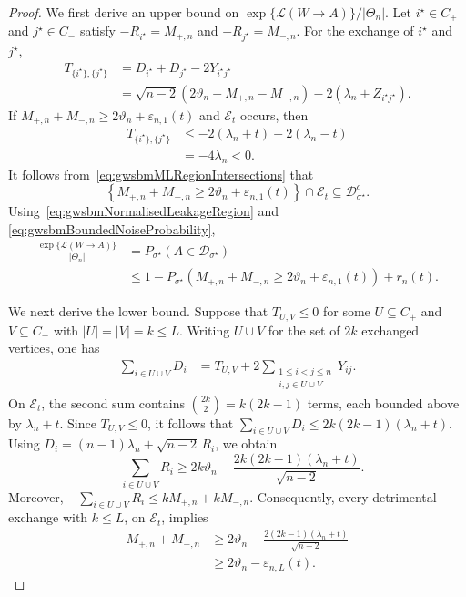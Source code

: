 \documentclass[10pt,a4paper]{amsart}
\newcommand{\ml}[2]{\mathcal{L}(#1\!\to\!#2)}
\begin{document}
\begin{proof}
We first derive an upper bound on
$\exp\{\ml{W}{A}\}/|\Theta_n|$. Let
$i^\star\in C_+$ and $j^\star\in C_-$ satisfy
\(-R_{i^\star}=M_{+,n}\) and \(-R_{j^\star}=M_{-,n}\).
For the exchange of $i^\star$ and $j^\star$,
\begin{align}
T_{\{i^\star\},\{j^\star\}}
&=
D_{i^\star}+D_{j^\star}-2Y_{i^\star j^\star}\\
&=
\sqrt{n-2}
\left(
2\vartheta_n-M_{+,n}-M_{-,n}
\right)
-
2\left(
\lambda_n+Z_{i^\star j^\star}
\right).
\label{eq:gwsbmMostDetrimentalOneExchange}
\end{align}
If \(M_{+,n}+M_{-,n}\geq
2\vartheta_n+\varepsilon_{n,1}(t)\) and $\mathcal E_t$ occurs, then
\begin{align}
T_{\{i^\star\},\{j^\star\}}
&\leq
-2(\lambda_n+t)
-
2(\lambda_n-t)\\
&=
-4\lambda_n
<
0.
\end{align}
It follows from~\eqref{eq:gwsbmMLRegionIntersections} that
\begin{equation}
\left\{
M_{+,n}+M_{-,n}
\geq
2\vartheta_n+\varepsilon_{n,1}(t)
\right\}
\cap
\mathcal E_t
\subseteq
\mathcal D_{\sigma^\star}^c.
\label{eq:gwsbmLeakageUpperInclusion}
\end{equation}
Using~\eqref{eq:gwsbmNormalisedLeakageRegion} and
\eqref{eq:gwsbmBoundedNoiseProbability},
\begin{align}
\frac{\exp\{\ml{W}{A}\}}{|\Theta_n|}
&=
P_{\sigma^\star}
\left(
A\in\mathcal D_{\sigma^\star}
\right)\\
&\leq
1-
P_{\sigma^\star}
\left(
M_{+,n}+M_{-,n}
\geq
2\vartheta_n+\varepsilon_{n,1}(t)
\right)
+r_n(t).
\label{eq:gwsbmLeakageUpperBound}
\end{align}

We next derive the lower bound. Suppose that
$T_{U,V}\leq0$ for some \(U\subseteq C_+\) and \(V\subseteq C_-\)
with \(|U|=|V|=k\leq L\).
Writing $U\cup V$ for the set of $2k$ exchanged vertices, one has
\begin{align}
\sum_{i\in U\cup V}D_i
&=
T_{U,V}
+
2
\sum_{\substack{1\leq i<j\leq n\\
i,j\in U\cup V}}
Y_{ij}.
\label{eq:gwsbmVertexScoreDecomposition}
\end{align}
On $\mathcal E_t$, the second sum contains
\(\binom{2k}{2}=k(2k-1)\) terms, each bounded above by
$\lambda_n+t$. Since $T_{U,V}\leq0$, it follows that
\(\sum_{i\in U\cup V}D_i\leq2k(2k-1)(\lambda_n+t)\).
Using \(D_i=(n-1)\lambda_n+\sqrt{n-2}\,R_i\),
we obtain
\begin{equation}
-\sum_{i\in U\cup V}R_i
\geq
2k\vartheta_n
-
\frac{
2k(2k-1)(\lambda_n+t)
}{
\sqrt{n-2}
}.
\label{eq:gwsbmDetrimentalSmallExchangeLower}
\end{equation}
Moreover,
\(-\sum_{i\in U\cup V}R_i\leq kM_{+,n}+kM_{-,n}\).
Consequently, every detrimental exchange with $k\leq L$, on
$\mathcal E_t$, implies
\begin{align}
M_{+,n}+M_{-,n}
&\geq
2\vartheta_n
-
\frac{
2(2k-1)(\lambda_n+t)
}{
\sqrt{n-2}
}\\
&\geq
2\vartheta_n-\varepsilon_{n,L}(t).
\label{eq:gwsbmSmallExchangeImplication}
\end{align}


\end{proof}
\end{document}
